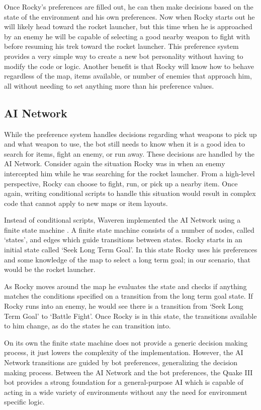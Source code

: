 Once Rocky's preferences are filled out, he can then make decisions based on the state of the environment and his own preferences. Now when Rocky starts out he will likely head toward the rocket launcher, but this time when he is approached by an enemy he will be capable of selecting a good nearby weapon to fight with before resuming his trek toward the rocket launcher. This preference system provides a very simple way to create a new bot personality without having to modify the code or logic. Another benefit is that Rocky will know how to behave regardless of the map, items available, or number of enemies that approach him, all without needing to set anything more than his preference values.

\subsection{AI Network}

While the preference system handles decisions regarding what weapons to pick up and what weapon to use, the bot still needs to know when it is a good idea to search for items, fight an enemy, or run away. These decisions are handled by the AI Network. Consider again the situation Rocky was in when an enemy intercepted him while he was searching for the rocket launcher. From a high-level perspective, Rocky can choose to fight, run, or pick up a nearby item. Once again, writing conditional scripts to handle this situation would result in complex code that cannot apply to new maps or item layouts.

Instead of conditional scripts, Waveren implemented the AI Network using a finite state machine \cite{q3bot}. A finite state machine consists of a number of nodes, called  `states', and edges which guide transitions between states. Rocky starts in an initial state called `Seek Long Term Goal'. In this state Rocky uses his preferences and some knowledge of the map to select a long term goal; in our scenario, that would be the rocket launcher. 

As Rocky moves around the map he evaluates the state and checks if anything matches the conditions specified on a transition from the long term goal state. If Rocky runs into an enemy, he would see there is a transition from `Seek Long Term Goal' to `Battle Fight'. Once Rocky is in this state, the transitions available to him change, as do the states he can transition into. 

On its own the finite state machine does not provide a generic decision making process, it just lowers the complexity of the implementation. However, the AI Network transitions are guided by bot preferences, generalizing the decision making process. Between the AI Network and the bot preferences, the Quake III bot provides a strong foundation for a general-purpose AI which is capable of acting in a wide variety of environments without any the need for environment specific logic.

